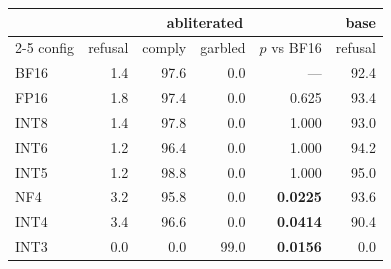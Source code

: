 \begin{tabular}{lrrrrr}
\toprule
& \multicolumn{4}{c}{abliterated} & base \\
\cmidrule(lr){2-5}
config & refusal & comply & garbled & $p$ vs BF16 & refusal \\
\midrule
BF16 & 1.4 & 97.6 & 0.0 & --- & 92.4 \\
FP16 & 1.8 & 97.4 & 0.0 & 0.625 & 93.4 \\
INT8 & 1.4 & 97.8 & 0.0 & 1.000 & 93.0 \\
INT6 & 1.2 & 96.4 & 0.0 & 1.000 & 94.2 \\
INT5 & 1.2 & 98.8 & 0.0 & 1.000 & 95.0 \\
NF4 & 3.2 & 95.8 & 0.0 & \textbf{0.0225} & 93.6 \\
INT4 & 3.4 & 96.6 & 0.0 & \textbf{0.0414} & 90.4 \\
INT3 & 0.0 & 0.0 & 99.0 & \textbf{0.0156} & 0.0 \\
\bottomrule
\end{tabular}
